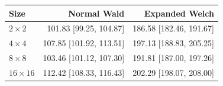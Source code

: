\begin{tabular}{@{}lrr@{}}
\toprule
Size & Normal Wald & Expanded Welch\\
\midrule
\(2\times2\) & 101.83 [99.25, 104.87] & 186.58 [182.46, 191.67]\\
\(4\times4\) & 107.85 [101.92, 113.51] & 197.13 [188.83, 205.25]\\
\(8\times8\) & 103.46 [101.12, 107.30] & 191.81 [187.00, 197.26]\\
\(16\times16\) & 112.42 [108.33, 116.43] & 202.29 [198.07, 208.00]\\
\bottomrule
\end{tabular}
